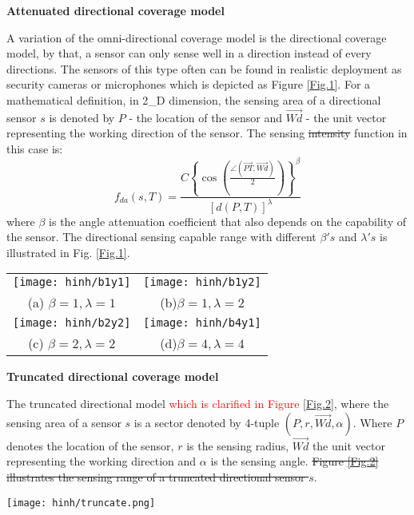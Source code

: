 \documentclass[final]{elsarticle}
\begin{document}
\noindent\textbf{Attenuated directional coverage model}

A variation of the omni-directional coverage model is the directional coverage model, by that, a sensor can only sense well in a direction instead of every directions. The sensors of this type often can be found in realistic deployment as security cameras or microphones which is depicted as Figure \ref{Fig.1}. For a mathematical definition, in 2\_D dimension, the sensing area of a directional sensor $ s $ is denoted by $ P $ - the location of the sensor and $ \overrightarrow{Wd}$ - the unit vector representing the working direction of the sensor. The sensing \sout{intensity} function in this case is:
\begin{equation}
\label{eq2}
f_{da}({s},T) = \frac{{C{{\left\{ {\cos \left( {\frac{{\angle (\overrightarrow {PT} ,\overrightarrow {Wd}) }}{2}} \right)} \right\}}^\beta }}}{{{{\left[ {d(P,T)} \right]}^\lambda }}}
\end{equation}
where $\beta$ is the angle attenuation coefficient that also depends on the capability of the sensor. The directional sensing capable range with different $ \beta's $ and $ \lambda's $ is illustrated in Fig. \ref{Fig.1}. \\
\begin{figure*}[h]
	\begin{tabular}{cc}
		\texttt{[image: hinh/b1y1]}&\texttt{[image: hinh/b1y2]}\\
		(a) $\beta =1, \lambda=1 $ &(b)$ \beta=1, \lambda=2 $\\
		\texttt{[image: hinh/b2y2]}&\texttt{[image: hinh/b4y1]}\\
		(c) $ \beta=2, \lambda=2 $& (d)$ \beta=4, \lambda=4 $\\
	\end{tabular}
	\centering
	\caption{Illustration attenuated directional sensing model with different $ \beta's $ and $ \lambda's $
	}
	\label{Fig.1}       %
\end{figure*}

\noindent\textbf{Truncated directional coverage model} 

The truncated directional model \textcolor{red}{which is clarified in Figure \ref{Fig.2}}, where the sensing area of a sensor $ s $ is a sector denoted by 4-tuple $( P, r, \overrightarrow{Wd}, \alpha )$. Where $ P $ denotes the location of the sensor, $ r $ is the sensing radius, $ \overrightarrow{Wd}$ the unit vector representing the working direction and $ \alpha $ is the sensing angle. \sout{Figure \ref{Fig.2} illustrates the sensing range of a truncated directional sensor $ s $}. 
\begin{figure*}[h]
	\centering
	\texttt{[image: hinh/truncate.png]}
	\caption{Sensing capability of truncated directional sensor}
	\label{Fig.2}       %
\end{figure*}
\end{document}
